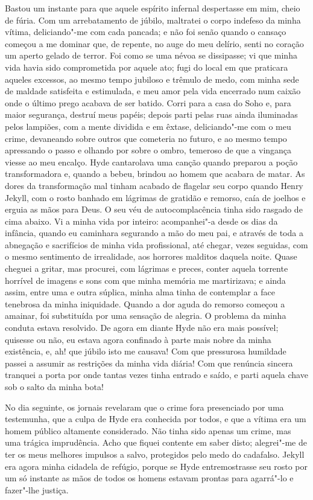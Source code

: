 Bastou um instante para que aquele espírito infernal despertasse em mim,
cheio de fúria.  Com um arrebatamento de júbilo, maltratei o corpo
indefeso da minha vítima, deliciando"-me com cada pancada; e não foi
senão quando o cansaço começou a me dominar que, de repente, no auge do
meu delírio, senti no coração um aperto gelado de terror.  Foi como se
uma névoa se dissipasse; vi que minha vida havia sido comprometida por
aquele ato; fugi do local em que praticara aqueles excessos, ao mesmo
tempo jubiloso e trêmulo de medo, com minha sede de maldade satisfeita
e estimulada, e meu amor pela vida encerrado num caixão onde o último
prego acabava de ser batido.  Corri para a casa do Soho e, para maior
segurança, destruí meus papéis; depois parti pelas ruas ainda
iluminadas pelos lampiões, com a mente dividida e em êxtase,
deliciando"-me com o meu crime, devaneando sobre outros que cometeria no
futuro, e ao mesmo tempo apressando o passo e olhando por sobre o
ombro, temeroso de que a vingança viesse ao meu encalço.  Hyde
cantarolava uma canção quando preparou a poção transformadora e, quando
a bebeu, brindou ao homem que acabara de matar.  As dores da
transformação mal tinham acabado de flagelar seu corpo quando Henry
Jekyll, com o rosto banhado em lágrimas de gratidão e remorso, caía de
joelhos e erguia as mãos para Deus.  O seu véu de autocomplacência
tinha sido rasgado de cima abaixo.  Vi a minha vida por inteiro:
acompanhei"-a desde os dias da infância, quando eu caminhara segurando a
mão do meu pai, e através de toda a abnegação e sacrifícios de minha
vida profissional, até chegar, vezes seguidas, com o mesmo sentimento
de irrealidade, aos horrores malditos daquela noite.  Quase cheguei a
gritar, mas procurei, com lágrimas e preces, conter aquela torrente
horrível de imagens e sons com que minha memória me martirizava; e
ainda assim, entre uma e outra súplica, minha alma tinha de contemplar
a face tenebrosa da minha iniquidade. Quando a dor aguda do remorso
começou a amainar, foi substituída por uma sensação de alegria.  O
problema da minha conduta estava resolvido.  De agora em diante Hyde
não era mais possível; quisesse ou não, eu estava agora confinado à
parte mais nobre da minha existência, e, ah! que júbilo isto me
causava!  Com que pressurosa humildade passei a assumir as restrições
da minha vida diária!  Com que renúncia sincera tranquei a porta por
onde tantas vezes tinha entrado e saído, e parti aquela chave sob o
salto da minha bota!

No dia seguinte, os jornais revelaram que o crime fora presenciado por
uma testemunha, que a culpa de Hyde era conhecida por todos, e que a
vítima era um homem público altamente considerado.  Não tinha sido
apenas um crime, mas uma trágica imprudência.  Acho que fiquei contente
em saber disto; alegrei"-me de ter os meus melhores impulsos a salvo,
protegidos pelo medo do cadafalso.  Jekyll era agora minha cidadela de
refúgio, porque se Hyde entremostrasse seu rosto por um só instante as
mãos de todos os homens estavam prontas para agarrá"-lo e fazer"-lhe
justiça. 

